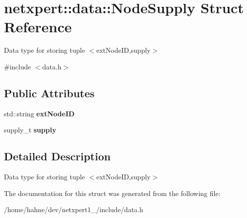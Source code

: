 \hypertarget{structnetxpert_1_1data_1_1NodeSupply}{}\section{netxpert\+:\+:data\+:\+:Node\+Supply Struct Reference}
\label{structnetxpert_1_1data_1_1NodeSupply}


Data type for storing tuple $<$ext\+Node\+ID,supply$>$  




{\ttfamily \#include $<$data.\+h$>$}

\subsection*{Public Attributes}
\begin{DoxyCompactItemize}
\item 
std\+::string {\bfseries ext\+Node\+ID}\hypertarget{structnetxpert_1_1data_1_1NodeSupply_ae977142b5eda0491bf9e834cadaa0a88}{}\label{structnetxpert_1_1data_1_1NodeSupply_ae977142b5eda0491bf9e834cadaa0a88}

\item 
supply\+\_\+t {\bfseries supply}\hypertarget{structnetxpert_1_1data_1_1NodeSupply_a8d065c3f62a0aa29a2cd854b22e7c6bf}{}\label{structnetxpert_1_1data_1_1NodeSupply_a8d065c3f62a0aa29a2cd854b22e7c6bf}

\end{DoxyCompactItemize}


\subsection{Detailed Description}
Data type for storing tuple $<$ext\+Node\+ID,supply$>$ 

The documentation for this struct was generated from the following file\+:\begin{DoxyCompactItemize}
\item 
/home/hahne/dev/netxpert1\+\_/include/data.\+h\end{DoxyCompactItemize}
